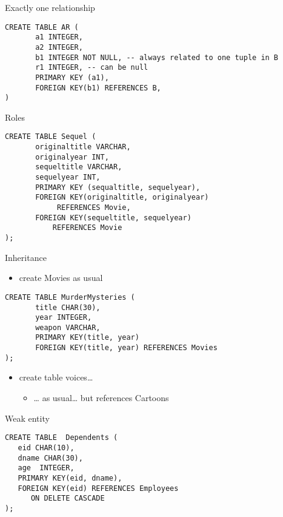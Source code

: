 \documentclass[presentation]{beamer}
\begin{document}
\begin{frame}[fragile,label={sec:org85625c7}]{Exactly one relationship}
 \small

\begin{verbatim}
CREATE TABLE AR (
       a1 INTEGER,
       a2 INTEGER,
       b1 INTEGER NOT NULL, -- always related to one tuple in B
       r1 INTEGER, -- can be null
       PRIMARY KEY (a1),
       FOREIGN KEY(b1) REFERENCES B,
)

\end{verbatim}
\end{frame}



\begin{frame}[fragile,label={sec:orgd1b2575}]{Roles}
 \small

\begin{verbatim}
CREATE TABLE Sequel (
       originaltitle VARCHAR,
       originalyear INT,
       sequeltitle VARCHAR,
       sequelyear INT,
       PRIMARY KEY (sequaltitle, sequelyear),
       FOREIGN KEY(originaltitle, originalyear) 
            REFERENCES Movie,
       FOREIGN KEY(sequeltitle, sequelyear) 
           REFERENCES Movie
);
\end{verbatim}
\end{frame}

\begin{frame}[fragile,label={sec:org1ec4c73}]{Inheritance}
 \begin{itemize}
\item create \alert{Movies} as usual
\end{itemize}

\begin{verbatim}
CREATE TABLE MurderMysteries (
       title CHAR(30),
       year INTEGER,
       weapon VARCHAR,
       PRIMARY KEY(title, year)
       FOREIGN KEY(title, year) REFERENCES Movies
);

\end{verbatim}

\begin{itemize}
\item create table voices\ldots{} 
\begin{itemize}
\item \ldots{} as usual\ldots{} but references Cartoons
\end{itemize}
\end{itemize}
\end{frame}

\begin{frame}[fragile,label={sec:org0fe5608}]{Weak entity}
 \begin{verbatim}
CREATE TABLE  Dependents (
   eid CHAR(10),
   dname CHAR(30),
   age  INTEGER,
   PRIMARY KEY(eid, dname),
   FOREIGN KEY(eid) REFERENCES Employees
      ON DELETE CASCADE
);

\end{verbatim}
\end{frame}
\end{document}
